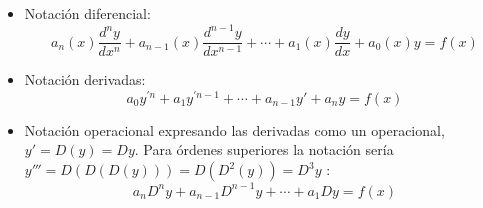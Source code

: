 \documentclass[a4paper,12pt,titlepage]{article}
\begin{document}
\begin{itemize}
    \item Notación diferencial: \newline
    \begin{equation}
        a_n(x) \frac{d^n y}{d x^n}+a_{n-1}(x) \frac{d^{n-1} y}{d x^{n-1}}+\cdots+a_1(x) \frac{d y}{d x}+a_0(x) y=f(x)
    \end{equation}

    \item Notación derivadas: \newline
    \begin{equation}
        a_0y^{'n} + a_1y^{'n-1} + \cdots + a_{n-1}y' + a_ny = f(x)
    \end{equation}

    \item Notación operacional expresando las derivadas como un operacional, $y' = D(y) = Dy$. Para órdenes superiores la notación sería $y''' = D(D(D(y))) = D(D^2(y)) = D^3y$ : \newline
    \begin{equation}
        a_n D^ny + a_{n-1} D^{n-1}y + \cdots + a_1 Dy = f(x)
    \end{equation}
\end{itemize}
\end{document}
